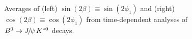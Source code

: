 \begin{figure}[htb]
  \begin{center}
    \hfill
  \end{center}
  \vspace{-0.5cm}
  \caption{
    Averages of 
    (left) $\sin(2\beta) \equiv \sin(2\phi_1)$ and
    (right) $\cos(2\beta) \equiv \cos(2\phi_1)$
    from time-dependent analyses of $B^0 \to {J\mskip -3mu/\mskip -2mu\psi\mskip 2mu} K^{*0}$ decays.
  }
  \label{fig:cp_uta:JpsiKstar}
\end{figure}

